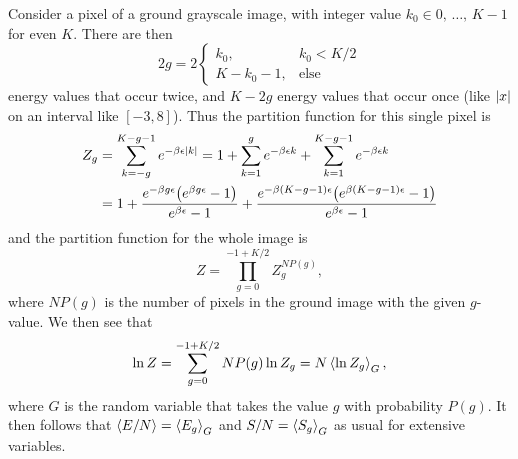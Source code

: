 \documentclass[../notebook.tex]{subfiles}
\begin{document}
\begin{eg}
  Consider a pixel of a ground grayscale image, with integer value $k_0 \in 0,\,
  \ldots,\, K-1$ for even $K$. There are then
  \[
    2g
    = 2\begin{cases}
      k_0, & k_0 < K/2 \\
      K - k_0 - 1, & \text{else}
    \end{cases}
  \]
  energy values that occur twice, and $K - 2g$ energy values that occur once
  (like $\abs{x}$ on an interval like $[-3, 8]$). Thus the partition function
  for this single pixel is
  \begin{align}
    \label{eq:Zpixel}
    Z_g
    &= \sum_{k=-g}^{K-g-1} e^{-\beta\epsilon\abs{k}}
    = 1
    + \sum_{k=1}^g e^{-\beta\epsilon k}
    + \sum_{k=1}^{K-g-1} e^{-\beta\epsilon k} \\
    &= 1
    + \frac{e^{-\beta g\epsilon}\qty(e^{\beta g\epsilon} - 1)}{e^{\beta\epsilon} - 1}
    + \frac{e^{-\beta (K-g-1)\epsilon}\qty(e^{\beta (K-g-1)\epsilon} -
    1)}{e^{\beta\epsilon} - 1}
  \end{align}
  and the partition function for the whole image is
  \begin{equation}
    \label{eq:Zimage}
    Z
    = \prod_{g = 0}^{-1 + K/2} Z_g^{NP(g)},
  \end{equation}
  where $NP(g)$ is the number of pixels in the ground image with the given
  $g$-value. We then see that
  \[
    \ln Z
    = \sum_{g = 0}^{-1 + K/2} NP(g) \ln Z_g
    = N\ev{\ln Z_g}_G,
  \]
  where $G$ is the random variable that takes the value $g$ with probability
  $P(g)$. It then follows that $\ev{E/N} = \ev{E_g}_G$ and $S/N = \ev{S_g}_G$ as
  usual for extensive variables.
\end{eg}
\end{document}
